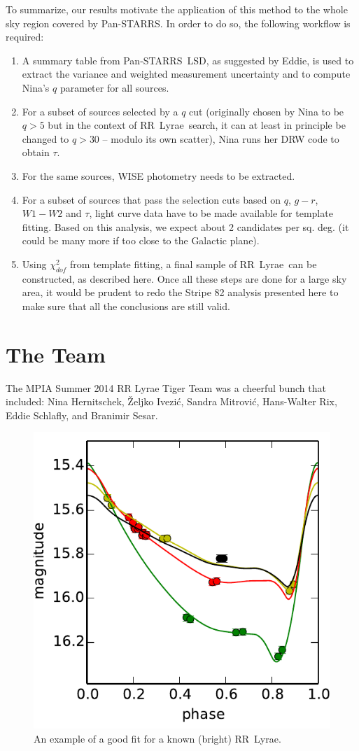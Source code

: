 \documentclass[12pt, preprint]{aastex}
\def\PS  {\hbox{Pan-STARRS}}
\def\RR  {\hbox{RR Lyrae}}
\begin{document}
To summarize, our results motivate the application of this method to the whole sky region covered 
by \PS. In order to do so, the following workflow is required: 
\begin{enumerate}
\item A summary table from \PS\ LSD, as suggested by Eddie, is used to extract 
the variance and weighted measurement uncertainty and to compute Nina's $q$ parameter
for all sources. 
\item For a subset of sources selected by a $q$ cut (originally chosen by Nina to be $q>5$
but in the context of \RR\ search, it can at least in principle be changed to $q>30$ -- modulo 
its own scatter), Nina runs her DRW code to obtain $\tau$. 
\item For the same sources, WISE photometry needs to be extracted. 
\item For a subset of sources that pass the selection cuts based on $q$, $g-r$, $W1-W2$ and
$\tau$, light curve data have to be made available for template fitting. Based on this analysis,
we expect about 2 candidates per sq. deg. (it could be many more if too close to the Galactic
plane). 
\item Using $\chi^2_{dof}$ from template fitting, a final sample of \RR\ can be constructed, as
described here. Once all these steps are done for a large sky area, it would be prudent 
to redo the Stripe 82 analysis presented here to make sure that all the conclusions are
still valid. 
\end{enumerate}


\section{The Team}

The MPIA Summer 2014 RR Lyrae Tiger Team was a cheerful bunch that included:
Nina Hernitschek, \v{Z}eljko Ivezi\'{c}, Sandra Mitrovi\'{c}, Hans-Walter Rix, Eddie Schlafly, 
and Branimir Sesar. 




\begin{figure}[!t]
\vskip -0.2in
\hskip 1.3in
\includegraphics[width=0.5\hsize,clip]{LCniceRR1.pdf}
\caption{An example of a good fit for a known (bright) \RR.} 
\label{Fig:LC1}
\end{figure}
\end{document}
